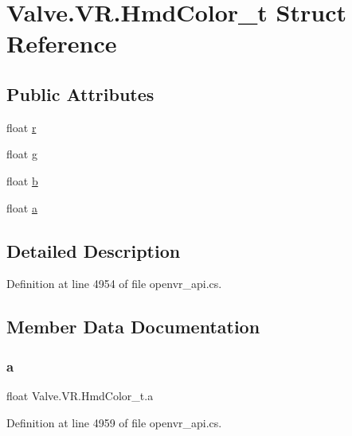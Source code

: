 \hypertarget{struct_valve_1_1_v_r_1_1_hmd_color__t}{}\section{Valve.\+V\+R.\+Hmd\+Color\+\_\+t Struct Reference}
\label{struct_valve_1_1_v_r_1_1_hmd_color__t}
\subsection*{Public Attributes}
\begin{DoxyCompactItemize}
\item 
float \mbox{\hyperlink{struct_valve_1_1_v_r_1_1_hmd_color__t_a617020cac96be8efd3e426028026e214}{r}}
\item 
float \mbox{\hyperlink{struct_valve_1_1_v_r_1_1_hmd_color__t_adc5207bc59ae0991b566472dcdd5f8dd}{g}}
\item 
float \mbox{\hyperlink{struct_valve_1_1_v_r_1_1_hmd_color__t_aa1f060f53f7deb971c8ba3c647dde469}{b}}
\item 
float \mbox{\hyperlink{struct_valve_1_1_v_r_1_1_hmd_color__t_a2e664fd0fe678dec99dd4062ca9133cc}{a}}
\end{DoxyCompactItemize}


\subsection{Detailed Description}


Definition at line 4954 of file openvr\+\_\+api.\+cs.



\subsection{Member Data Documentation}
\mbox{\label{struct_valve_1_1_v_r_1_1_hmd_color__t_a2e664fd0fe678dec99dd4062ca9133cc}} 
\subsubsection{\texorpdfstring{a}{a}}
{\footnotesize\ttfamily float Valve.\+V\+R.\+Hmd\+Color\+\_\+t.\+a}



Definition at line 4959 of file openvr\+\_\+api.\+cs.

